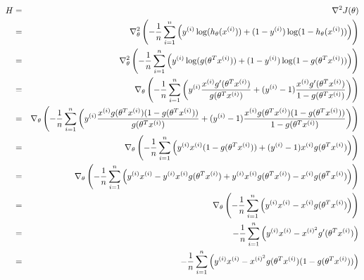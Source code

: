 \begin{answer}
\begin{eqnarray*}
H&=&\nabla^2J(\theta)\\
&=&\nabla_\theta^2\left(-\frac{1}{{n}}\sum_{i=1}^{n}\left(y^{(i)}\log(h_{\theta}(x^{(i)}))+(1-y^{(i)})\log(1-h_{\theta}(x^{(i)}))\right)\right)\\
&=&\nabla_\theta^2\left(-\frac{1}{{n}}\sum_{i=1}^{n}\left(y^{(i)}\log(g(\theta^T x^{(i)}))+(1-y^{(i)})\log(1-g(\theta^T x^{(i)}))\right)\right)\\
&=&\nabla_\theta\left(-\frac{1}{{n}}\sum_{i=1}^{n}\left(y^{(i)}\frac{x^{(i)}g'(\theta^T x^{(i)})}{g(\theta^T x^{(i)})}+(y^{(i)}-1)\frac{x^{(i)}g'(\theta^T x^{(i)})}{1-g(\theta^T x^{(i)})}\right)\right)\\
&=&\nabla_\theta\left(-\frac{1}{{n}}\sum_{i=1}^{n}\left(y^{(i)}\frac{x^{(i)}g(\theta^T x^{(i)})(1-g(\theta^T x^{(i)}))}{g(\theta^T x^{(i)})}+(y^{(i)}-1)\frac{x^{(i)}g(\theta^T x^{(i)})(1-g(\theta^T x^{(i)}))}{1-g(\theta^T x^{(i)})}\right)\right)\\
&=&\nabla_\theta\left(-\frac{1}{{n}}\sum_{i=1}^{n}\left(y^{(i)}x^{(i)}(1-g(\theta^T x^{(i)}))+(y^{(i)}-1)x^{(i)}g(\theta^T x^{(i)})\right)\right)\\
&=&\nabla_\theta\left(-\frac{1}{{n}}\sum_{i=1}^{n}\left(y^{(i)}x^{(i)}-y^{(i)}x^{(i)}g(\theta^T x^{(i)})+y^{(i)}x^{(i)}g(\theta^T x^{(i)})-x^{(i)}g(\theta^T x^{(i)})\right)\right)\\
&=&\nabla_\theta\left(-\frac{1}{{n}}\sum_{i=1}^{n}\left(y^{(i)}x^{(i)}-x^{(i)}g(\theta^T x^{(i)})\right)\right)\\
&=&-\frac{1}{{n}}\sum_{i=1}^{n}\left(y^{(i)}x^{(i)}-x^{(i)^2}g'(\theta^T x^{(i)})\right)\\
&=&-\frac{1}{{n}}\sum_{i=1}^{n}\left(y^{(i)}x^{(i)}-x^{(i)^2}g(\theta^T x^{(i)})(1-g(\theta^T x^{(i)}))\right)\\
\end{eqnarray*}
\end{answer}
